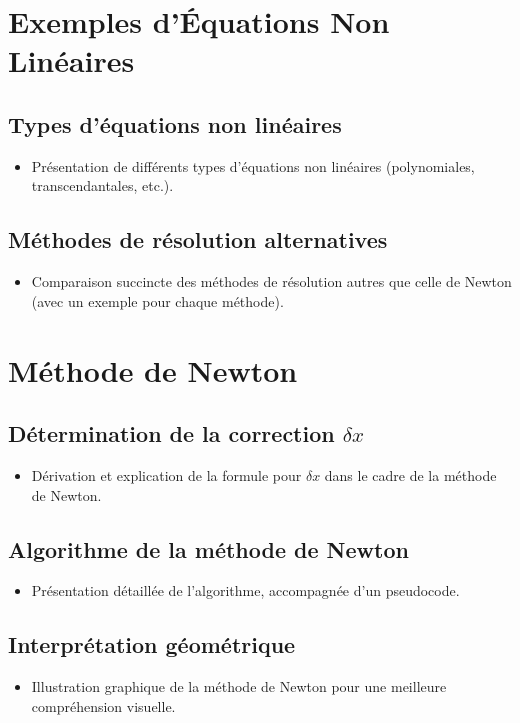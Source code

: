 \documentclass{article}
\begin{document}
\section{Exemples d'Équations Non Linéaires}
\subsection{Types d'équations non linéaires}
\begin{itemize}
    \item Présentation de différents types d'équations non linéaires (polynomiales, transcendantales, etc.).
\end{itemize}
\subsection{Méthodes de résolution alternatives}
\begin{itemize}
    \item Comparaison succincte des méthodes de résolution autres que celle de Newton (avec un exemple pour chaque méthode).
\end{itemize}

\section{Méthode de Newton}
\subsection{Détermination de la correction \(\delta x\)}
\begin{itemize}
    \item Dérivation et explication de la formule pour \(\delta x\) dans le cadre de la méthode de Newton.
\end{itemize}
\subsection{Algorithme de la méthode de Newton}
\begin{itemize}
    \item Présentation détaillée de l'algorithme, accompagnée d'un pseudocode.
\end{itemize}
\subsection{Interprétation géométrique}
\begin{itemize}
    \item Illustration graphique de la méthode de Newton pour une meilleure compréhension visuelle.
\end{itemize}
\end{document}
